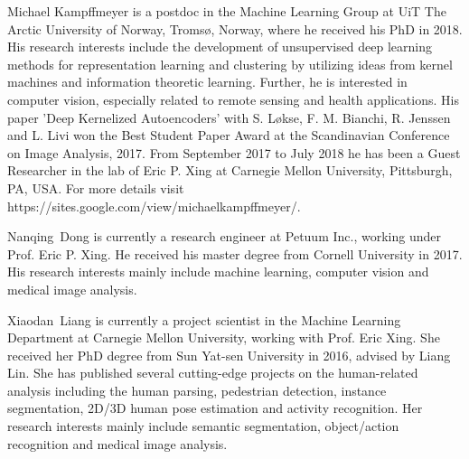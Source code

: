 \documentclass[journal]{IEEEtran}
\begin{document}
\ifCLASSOPTIONcaptionsoff
  \newpage
\fi




\begin{IEEEbiography}{Michael Kampffmeyer}%
is a postdoc in the Machine Learning Group at UiT The Arctic University of Norway, Troms{\o}, Norway, where he received his PhD in 2018. His research interests include the development of unsupervised deep learning methods for representation learning and clustering by utilizing ideas from kernel machines and information theoretic learning. Further, he is interested in computer vision, especially related to remote sensing and health applications. His paper 'Deep Kernelized Autoencoders' with S. L{\o}kse, F. M. Bianchi, R. Jenssen and L. Livi won the Best Student Paper Award at the Scandinavian Conference on Image Analysis, 2017. 
From September 2017 to July 2018 he has been a Guest Researcher in the lab of Eric P. Xing at Carnegie Mellon University, Pittsburgh, PA, USA. For more details visit https://sites.google.com/view/michaelkampffmeyer/.
\end{IEEEbiography}

\begin{IEEEbiography}{Nanqing~Dong} is currently a research engineer at Petuum Inc., working under Prof. Eric P. Xing. He received his master degree from Cornell University in 2017. His research interests mainly include machine learning, computer vision and medical image analysis.
\end{IEEEbiography}

\vspace{-1cm}
\begin{IEEEbiography}{Xiaodan~Liang}
is currently a project scientist in the Machine Learning Department at Carnegie Mellon University, working with Prof. Eric Xing. She received her PhD degree from Sun Yat-sen University in 2016, advised by Liang Lin. She has published several cutting-edge projects on the human-related analysis including the human parsing, pedestrian detection, instance segmentation, 2D/3D human pose estimation and activity recognition. Her research interests mainly include semantic segmentation, object/action recognition and medical image analysis.
\end{IEEEbiography}
\end{document}
